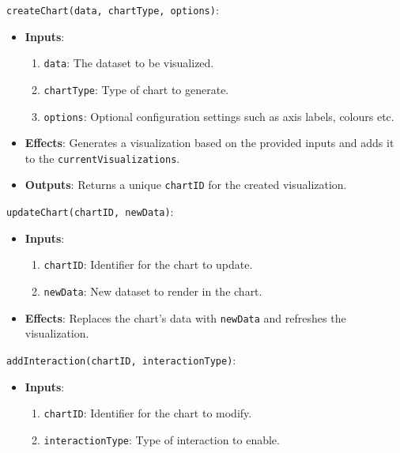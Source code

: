 \documentclass[12pt, titlepage]{article}
\begin{document}
\begin{description}
  \item[Access Routine Semantics:] 
  \item \texttt{createChart(data, chartType, options)}:
  \begin{itemize}
    \item \textbf{Inputs}:
    \begin{enumerate}
      \item \texttt{data}: The dataset to be visualized.
      \item \texttt{chartType}: Type of chart to generate.
      \item \texttt{options}: Optional configuration settings such as axis labels, colours etc.
    \end{enumerate}

    \item \textbf{Effects}: Generates a visualization based on the provided inputs and adds it to 
    the \texttt{currentVisualizations}.

    \item \textbf{Outputs}: Returns a unique \texttt{chartID} for the created visualization.
  \end{itemize}

  \item \texttt{updateChart(chartID, newData)}:
  \begin{itemize}
    \item \textbf{Inputs}:
    \begin{enumerate}
      \item \texttt{chartID}: Identifier for the chart to update.
      \item \texttt{newData}: New dataset to render in the chart.
    \end{enumerate}

    \item \textbf{Effects}: Replaces the chart's data with \texttt{newData} and refreshes the 
    visualization.
  \end{itemize}

  \item \texttt{addInteraction(chartID, interactionType)}:
  \begin{itemize}
    \item \textbf{Inputs}:
    \begin{enumerate}
      \item \texttt{chartID}: Identifier for the chart to modify.
      \item \texttt{interactionType}: Type of interaction to enable.
    \end{enumerate}


\end{itemize}
\end{description}
\end{document}
